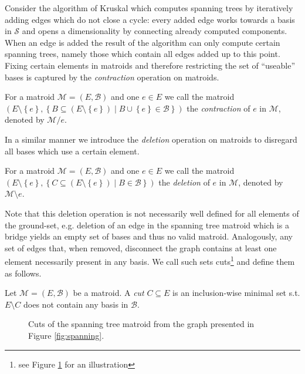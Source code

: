 \documentclass{scrartcl}
\theoremstyle{nonumberplain}
\newcommand{\tupel}[1]{\left(#1\right)}
\newcommand{\set}[1]{\left\{#1\right\}}
\begin{document}
Consider the algorithm of Kruskal which computes spanning trees by iteratively
adding edges which do not close a cycle: every added edge works towards a basis
in $\mathcal{S}$ and opens a dimensionality by connecting already computed
components.  When an edge is added the result of the algorithm can only compute
certain spanning trees, namely those which contain all edges added up to this
point. Fixing certain elements in matroids and therefore restricting the set of
\enquote{useable} bases is captured by the \emph{contraction} operation on
matroids.
\begin{defi}
  For a matroid $\mathcal{M} = \tupel{E, \mathcal{B}}$ and one $e\in E$ we call
  the matroid $\tupel{E\setminus\set{e}, \set{B\subseteq
  (E\setminus\set{e})\middle| B\cup\set{e}\in\mathcal{B}}}$ the
  \emph{contraction} of $e$ in $\mathcal{M}$, denoted by $\mathcal{M}/e$.
\end{defi}
In a similar manner we introduce the \emph{deletion} operation on matroids to
disregard all bases which use a certain element.
\begin{defi}
  For a matroid $\mathcal{M} = \tupel{E, \mathcal{B}}$ and one $e\in E$ we call
  the matroid $\tupel{E\setminus\set{e}, \set{C\subseteq
  (E\setminus\set{e})\middle| B\in\mathcal{B}}}$ the \emph{deletion} of $e$ in
  $\mathcal{M}$, denoted by $\mathcal{M}\setminus e$.
\end{defi}
Note that this deletion operation is not necessarily well defined for all
elements of the ground-set, e.g. deletion of an edge in the spanning tree
matroid which is a bridge yields an empty set of bases and thus no valid
matroid. Analogously, any set of edges that, when removed, disconnect the graph
contains at least one element necessarily present in any basis. We call such
sets cuts\footnote{see Figure \ref{fig:cuts} for an illustration} and define
them as follows.
\begin{defi}
  Let $\mathcal{M} = \tupel{E, \mathcal{B}}$ be a matroid. A \emph{cut}
  $C\subseteq E$ is an inclusion-wise minimal set s.t. $E\setminus C$ does not
  contain any basis in $\mathcal{B}$.
\end{defi}
\begin{figure}
  \begin{center}
  \end{center}
  \caption{Cuts of the spanning tree matroid from the graph presented in Figure
    \ref{fig:spanning}.}
  \label{fig:cuts}
\end{figure}
\end{document}
